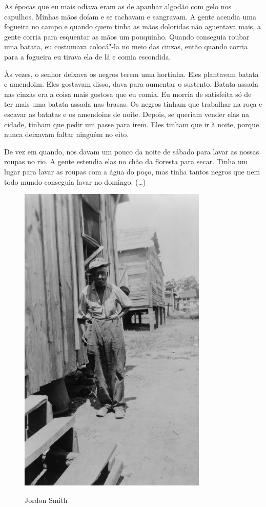 As épocas que eu mais odiava eram as de apanhar algodão com gelo nos
capulhos. Minhas mãos doíam e se rachavam e sangravam. A gente acendia
uma fogueira no campo e quando quem tinha as mãos doloridas não
aguentava mais, a gente corria para esquentar as mãos um pouquinho.
Quando conseguia roubar uma batata, eu costumava colocá"-la no meio das
cinzas, então quando corria para a fogueira eu tirava ela de lá e comia
escondida.

Às vezes, o senhor deixava os negros terem uma hortinha. Eles
plantavam batata e amendoim. Eles gostavam disso, dava para aumentar o
sustento. Batata assada nas cinzas era a coisa mais gostosa que eu
comia. Eu morria de satisfeita só de ter mais uma batata assada nas
brasas. Os negros tinham que trabalhar na roça e escavar as batatas e os
amendoins de noite. Depois, se queriam vender elas na cidade, tinham que
pedir um passe para irem. Eles tinham que ir à noite, porque nunca
deixavam faltar ninguém no eito.

De vez em quando, nos davam um pouco da noite de sábado para lavar as
nossas roupas no rio. A gente estendia elas no chão da floresta para
secar. Tinha um lugar para lavar as roupas com a água do poço, mas tinha
tantos negros que nem todo mundo conseguia lavar no domingo. (\ldots{})

\pagebreak
\thispagestyle{empty}
\begin{figure}[!ht]
\centering
 \includegraphics[width=90mm]{./imgs/jordonsmith_recorte.jpg} \label{img2}
\caption{Jordon Smith}
\end{figure}

